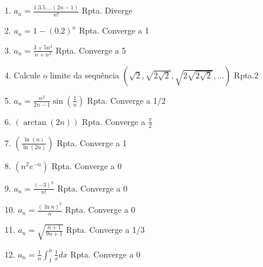 \begin{itemize}
	\item[1.] $a_{n}=\frac{1.3.5....(2n-1)}{n!}$ \quad \quad Rpta. Diverge
\end{itemize}
\begin{itemize}
	\item[2.] $a_{n}=1-(0.2)^{n}$ \quad \quad Rpta. Converge a 1
\end{itemize}
\begin{itemize}
	\item[3.]  $a_{n}=\frac{3+5n^{2}}{n+n^{2}}$ \quad \quad Rpta. Converge a 5
\end{itemize}
\begin{itemize}
	\item[4.] Calcule o limite da sequência $\left(  \sqrt{2},\sqrt{2\sqrt{2}},\sqrt{2\sqrt{2\sqrt{2}}}, ...\right)  $ \quad \quad Rpta.2
\end{itemize}
\begin{itemize}
	\item[5.]$a_{n}=\frac{n^{2}}{2n-1}\sin (\frac{1}{n})$ \quad \quad Rpta. Converge a 1/2
\end{itemize}
\begin{itemize}
	\item[6.] $\left(  \arctan(2n)\right)  $ \quad \quad Rpta. Converge a $\frac{\pi}{2}$
\end{itemize}
\begin{itemize}
	\item [7.] $\left(  \frac{\ln(n)}{\ln(2n)}\right) $ \quad \quad Rpta. Converge a 1
\end{itemize}
\begin{itemize}
	\item [8.] $\left(  n^{2}e^{-n}\right) $ \quad \quad Rpta. Converge a 0
\end{itemize}
\begin{itemize}
	\item [9.] $a_{n}=\frac{(-3)^{n}}{n!}$ \quad \quad Rpta. Converge a 0
\end{itemize}
\begin{itemize}
	\item [10.] $a_{n}=\frac{(\ln n)^{2}}{n}$ \quad \quad Rpta. Converge a 0
\end{itemize}
\begin{itemize}
	\item [11.] $a_{n}=\sqrt{\frac{n+1}{9n+1}}$ \quad\quad Rpta. Converge a 1/3
\end{itemize}
\begin{itemize}
	\item [12.] $a_{n}=\frac{1}{n}\int_{1}^{n}\frac{1}{x}dx$ \quad\quad Rpta. Converge a 0
\end{itemize}
